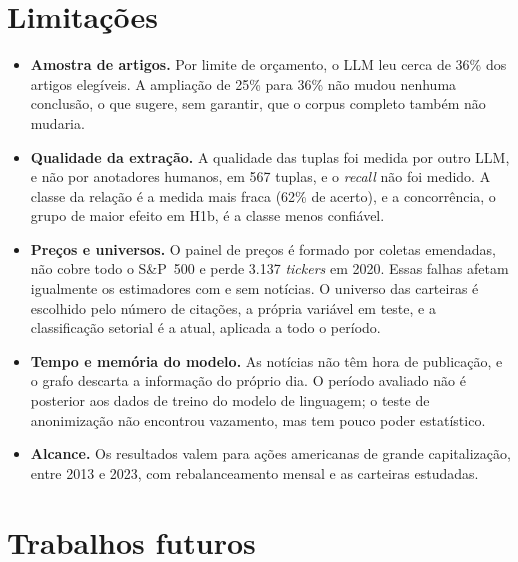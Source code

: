 \section{Limitações}
\label{sec:limitacoes}

\begin{itemize}
  \item \textbf{Amostra de artigos.} Por limite de orçamento, o LLM leu cerca de 36\% dos artigos
        elegíveis. A ampliação de 25\% para 36\% não mudou nenhuma conclusão, o que sugere, sem garantir,
        que o corpus completo também não mudaria.
  \item \textbf{Qualidade da extração.} A qualidade das tuplas foi medida por outro LLM, e não por
        anotadores humanos, em 567 tuplas, e o \emph{recall} não foi medido. A classe da relação é a
        medida mais fraca (62\% de acerto), e a concorrência, o grupo de maior efeito em H1b, é a classe
        menos confiável.
  \item \textbf{Preços e universos.} O painel de preços é formado por coletas emendadas, não cobre todo o
        S\&P~500 e perde 3.137 \emph{tickers} em 2020. Essas falhas afetam igualmente os estimadores com e
        sem notícias. O universo das carteiras é escolhido pelo número de citações, a própria variável em
        teste, e a classificação setorial é a atual, aplicada a todo o período.
  \item \textbf{Tempo e memória do modelo.} As notícias não têm hora de publicação, e o grafo descarta a
        informação do próprio dia. O período avaliado não é posterior aos dados de treino do modelo de
        linguagem; o teste de anonimização não encontrou vazamento, mas tem pouco poder estatístico.
  \item \textbf{Alcance.} Os resultados valem para ações americanas de grande capitalização, entre 2013 e
        2023, com rebalanceamento mensal e as carteiras estudadas.
\end{itemize}

\section{Trabalhos futuros}
\label{sec:futuros}

